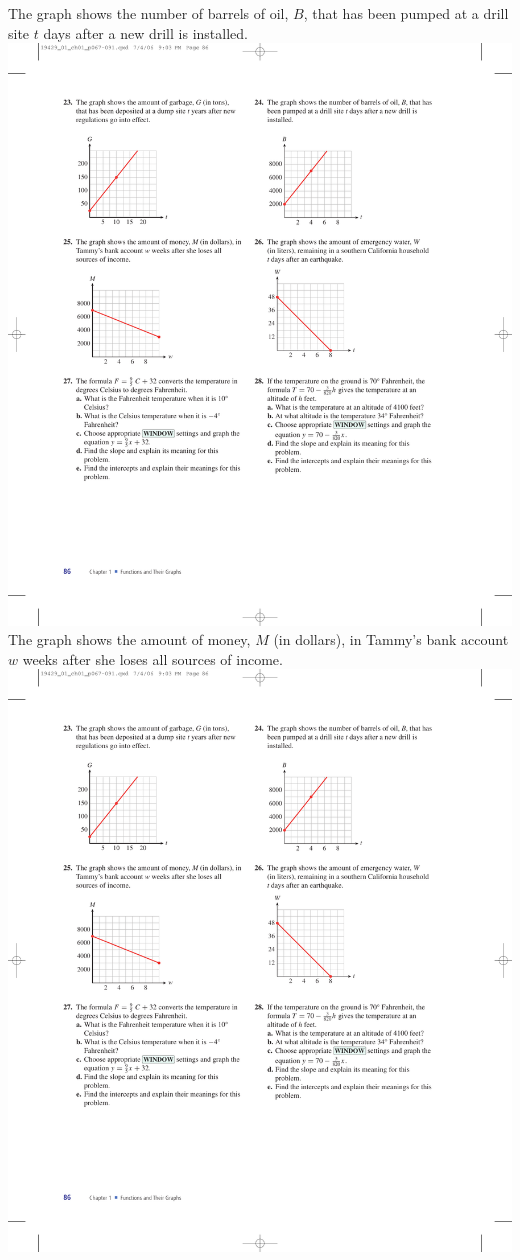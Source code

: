 \documentclass[10pt,]{book}
\theoremstyle{plain}
\theoremstyle{definition}
\theoremstyle{definition}
\theoremstyle{definition}
\theoremstyle{definition}
\numberwithin{equation}{part}
\begin{document}
\begin{exerciselist}
\begin{exercisegroup}
\exercise[24.]\hypertarget{exercise-310}{}The graph shows the number of barrels of oil, \(B\), that has been pumped at a drill site \(t\) days after a new drill is installed. \includegraphics[width=0.85\linewidth]{images/fig-ex-1-5-24}
%
\exercise[25.]\hypertarget{exercise-311}{}The graph shows the amount of money, \(M\) (in dollars), in Tammy’s bank account \(w\) weeks after she loses all sources of income. \includegraphics[width=0.8\linewidth]{images/fig-ex-1-5-25}

\end{exercisegroup}
\end{exerciselist}
\end{document}
